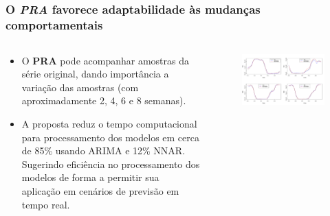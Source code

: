 \documentclass[aspectratio=169]{beamer}
\begin{document}
\subsection{}
\begin{frame}
\frametitle{O \textbf{\textit{PRA}} favorece adaptabilidade às mudanças comportamentais}
\small

\begin{columns}[T] %
\begin{column}{.4\textwidth}
\begin{itemize}\footnotesize
    \item O \textbf{PRA} pode acompanhar amostras da série original, dando importância a variação das amostras (com aproximadamente 2, 4, 6 e 8 semanas).
    \item A proposta reduz o tempo computacional para processamento dos modelos em cerca de 85\% usando ARIMA e 12\% NNAR. Sugerindo eficiência no processamento dos modelos de forma a permitir sua aplicação em cenários de previsão em tempo real.
    
\end{itemize}
\end{column}%

\hfill%

\begin{column}{.6\textwidth}
\centering
\begin{figure}[!htb]
\centering
\includegraphics[height=0.64\textwidth,angle=0]{melhoresCiclos3_3-eps-converted-to.pdf}
\end{figure}
\end{column}%
\end{columns}

\end{frame}
\end{document}
